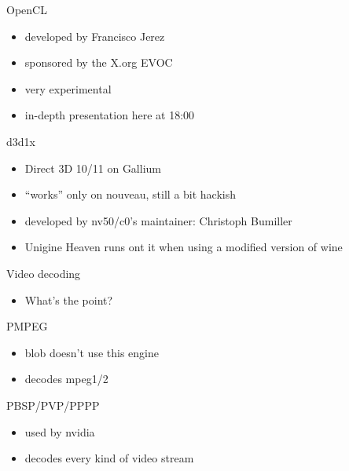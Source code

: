 \documentclass[11pt,english,compress]{beamer}
\begin{document}
		\begin{frame}
			\begin{block}{OpenCL}
				\begin{itemize}
					\item developed by Francisco Jerez
					\item sponsored by the X.org EVOC
					\item very experimental
					\item in-depth presentation here at 18:00
				\end{itemize}
			\end{block}

			\begin{block}{d3d1x}
				\begin{itemize}
					\item Direct 3D 10/11 on Gallium
					\item ``works'' only on nouveau, still a bit hackish
					\item developed by nv50/c0's maintainer: Christoph Bumiller
					\item Unigine Heaven runs ont it when using a modified version of wine
				\end{itemize}
			\end{block}
		\end{frame}

		\begin{frame}
			\begin{block}{Video decoding}
				\begin{itemize}
					\item What's the point?
				\end{itemize}
			\end{block}

			\begin{block}{PMPEG}
				\begin{itemize}
					\item blob doesn't use this engine
					\item decodes mpeg1/2
				\end{itemize}
			\end{block}

			\begin{block}{PBSP/PVP/PPPP}
				\begin{itemize}
					\item used by nvidia
					\item decodes every kind of video stream
				\end{itemize}
			\end{block}
		\end{frame}
\end{document}
